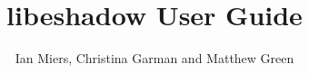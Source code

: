 \documentclass[12pt]{article}
\begin{document}
\newcommand{\libeshadow}{\textsf{libeshadow}}

\title{libeshadow User Guide}
\author{Ian Miers, Christina Garman and Matthew Green}
\date{}
\maketitle



\end{document}
